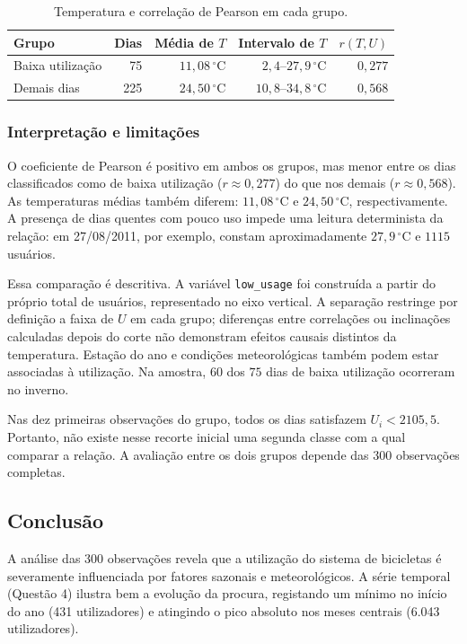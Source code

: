 \documentclass[12pt,a4paper]{article}
\begin{document}
\begin{table}[H]
\centering
\small
\caption{Temperatura e correlação de Pearson em cada grupo.}
\begin{tabular}{@{}lrrrr@{}}
\toprule
Grupo & Dias & Média de $T$ & Intervalo de $T$ & $r(T,U)$ \\
\midrule
Baixa utilização & 75 & $11{,}08\,^{\circ}\mathrm C$ & $2{,}4$--$27{,}9\,^{\circ}\mathrm C$ & $0{,}277$ \\
Demais dias & 225 & $24{,}50\,^{\circ}\mathrm C$ & $10{,}8$--$34{,}8\,^{\circ}\mathrm C$ & $0{,}568$ \\
\bottomrule
\end{tabular}
\end{table}

\subsubsection{Interpretação e limitações}

O coeficiente de Pearson é positivo em ambos os grupos, mas menor entre os
dias classificados como de baixa utilização ($r\approx0{,}277$) do que nos
demais ($r\approx0{,}568$). As temperaturas médias também diferem:
$11{,}08\,^{\circ}\mathrm C$ e $24{,}50\,^{\circ}\mathrm C$,
respectivamente. A presença de dias quentes com pouco uso impede uma leitura
determinista da relação: em 27/08/2011, por exemplo, constam aproximadamente
$27{,}9\,^{\circ}\mathrm C$ e $1115$ usuários.

Essa comparação é descritiva. A variável \texttt{low\_usage} foi construída
a partir do próprio total de usuários, representado no eixo vertical. A
separação restringe por definição a faixa de $U$ em cada grupo; diferenças
entre correlações ou inclinações calculadas depois do corte não demonstram
efeitos causais distintos da temperatura. Estação do ano e condições
meteorológicas também podem estar associadas à utilização. Na amostra,
$60$ dos $75$ dias de baixa utilização ocorreram no inverno.

Nas dez primeiras observações do grupo, todos os dias satisfazem
$U_i<2105{,}5$. Portanto, não existe nesse recorte inicial uma segunda
classe com a qual comparar a relação. A avaliação entre os dois grupos
depende das $300$ observações completas.

\subsection{Conclusão}

A análise das 300 observações revela que a utilização do sistema de bicicletas é severamente influenciada por fatores sazonais e meteorológicos. A série temporal (Questão 4) ilustra bem a evolução da procura, registando um mínimo no início do ano (431 utilizadores) e atingindo o pico absoluto nos meses centrais (6.043 utilizadores).
\end{document}
